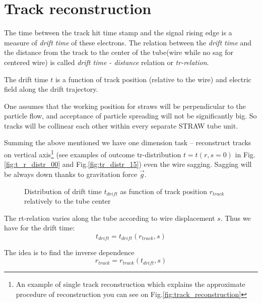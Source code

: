 \section{Track reconstruction}
\label{sec:track_reconstruction}

	The time between the track hit time stamp and the signal rising edge is a measure of {\it drift time} of these electrons. The relation between the   {\it drift time} and  the distance from the track to the center of the tube(wire while no sag for centered wire) is called {\it drift time - distance} relation or {\it tr-relation}.
	
	The drift time $t$ is a function of track position (relative to the wire) and electric field along the drift trajectory.
	
	One assumes that the working  position  for straws will be perpendicular to the particle flow, and  acceptance of particle spreading will not be significantly big. So tracks will be collinear each other within every separate  STRAW tube unit.
	
	Summing the above mentioned we have one dimension task -- reconstruct tracks on vertical axis\footnote{An example of single track reconstruction which explains the approximate procedure of reconstruction you can see on Fig.\ref{fig:track_reconstruction}}	(see examples of outcome tr-distribution $t = t(r,s=0)$ in Fig.\ref{fig:t_r_distr_00} and Fig.\ref{fig:tr_distr_15})  even the wire sagging. Sagging will be always down thanks to gravitation force $\vec{g}$.
	
	\begin{figure}[h!]
		\centering
		\qquad
		\caption{Distribution of drift time $t_{drift}$ as function of track position $r_{track}$ relatively to the tube center}			
	\end{figure}	
	
	The rt-relation varies along the tube according to wire displacement $s$. Thus we have for the drift time:
	\begin{equation}
	t_{drift} = t_{drift}(r_{track},s)
	\end{equation}
	
	The idea is to find the inverse dependence
	\begin{equation}
		r_{track} = r_{track}(t_{drift},s)
	\end{equation}
	
